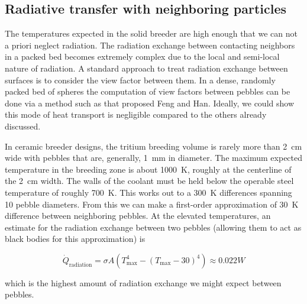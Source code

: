 
















\subsection{Radiative transfer with neighboring particles}

The temperatures expected in the solid breeder are high enough that we can not a priori neglect radiation. The radiation exchange between contacting neighbors in a packed bed becomes extremely complex due to the local and semi-local nature of radiation. A standard approach to treat radiation exchange between surfaces is to consider the view factor between them. In a dense, randomly packed bed of spheres the computation of view factors between pebbles can be done via a method such as that proposed Feng and Han\cite{Feng2012}. Ideally, we could show this mode of heat transport is negligible compared to the others already discussed.

In ceramic breeder designs, the tritium breeding volume is rarely more than \si{2 cm} wide with pebbles that are, generally, \si{1 mm} in diameter. The maximum expected temperature in the breeding zone is about \si{1000 K}, roughly at the centerline of the \si{2 cm} width. The walls of the coolant must be held below the operable steel temperature of roughly \si{700 K}. This works out to a \si{300 K} differences spanning 10 pebble diameters. From this we can make a first-order approximation of \si{30 K} difference between neighboring pebbles. At the elevated temperatures, an estimate for the radiation exchange between two pebbles (allowing them to act as black bodies for this approximation) is

\begin{equation}
	\dot{Q}_\text{radiation} = \sigma A \left(T_\text{max}^4 - (T_\text{max}-30)^4\right) \approx 0.022\si{W}
\end{equation}
 
 which is the highest amount of radiation exchange we might expect between pebbles. 
